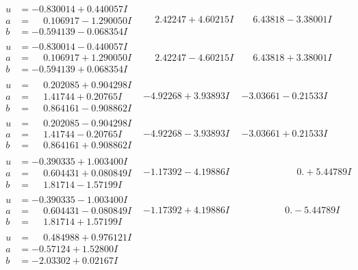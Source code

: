 \documentclass[1p]{elsarticle_modified}
\theoremstyle{definition}
\begin{document}
$$\begin{array}{c|c|c}
\begin{aligned}
u &= -0.830014 + 0.440057 I \\
a &= \phantom{-}0.106917 - 1.290050 I \\
b &= -0.594139 - 0.068354 I\end{aligned}
 & \phantom{-}2.42247 + 4.60215 I & \phantom{-}6.43818 - 3.38001 I \\ \hline\begin{aligned}
u &= -0.830014 - 0.440057 I \\
a &= \phantom{-}0.106917 + 1.290050 I \\
b &= -0.594139 + 0.068354 I\end{aligned}
 & \phantom{-}2.42247 - 4.60215 I & \phantom{-}6.43818 + 3.38001 I \\ \hline\begin{aligned}
u &= \phantom{-}0.202085 + 0.904298 I \\
a &= \phantom{-}1.41744 + 0.20765 I \\
b &= \phantom{-}0.864161 - 0.908862 I\end{aligned}
 & -4.92268 + 3.93893 I & -3.03661 - 0.21533 I \\ \hline\begin{aligned}
u &= \phantom{-}0.202085 - 0.904298 I \\
a &= \phantom{-}1.41744 - 0.20765 I \\
b &= \phantom{-}0.864161 + 0.908862 I\end{aligned}
 & -4.92268 - 3.93893 I & -3.03661 + 0.21533 I \\ \hline\begin{aligned}
u &= -0.390335 + 1.003400 I \\
a &= \phantom{-}0.604431 + 0.080849 I \\
b &= \phantom{-}1.81714 - 1.57199 I\end{aligned}
 & -1.17392 - 4.19886 I & \phantom{-0.000000 -}0. + 5.44789 I \\ \hline\begin{aligned}
u &= -0.390335 - 1.003400 I \\
a &= \phantom{-}0.604431 - 0.080849 I \\
b &= \phantom{-}1.81714 + 1.57199 I\end{aligned}
 & -1.17392 + 4.19886 I & \phantom{-0.000000 } 0. - 5.44789 I \\ \hline\begin{aligned}
u &= \phantom{-}0.484988 + 0.976121 I \\
a &= -0.57124 + 1.52800 I \\
b &= -2.03302 + 0.02167 I\end{aligned}

\end{array}$$
\end{document}
